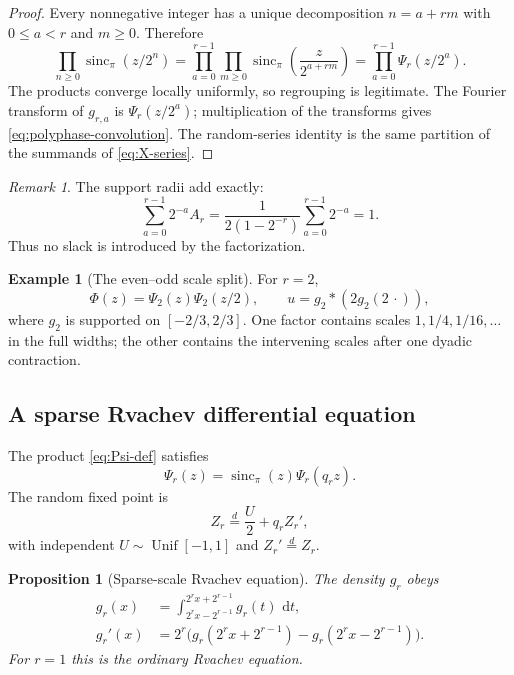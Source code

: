 \documentclass[11pt,oneside]{article}
\numberwithin{equation}{section}
\newtheorem{proposition}[theorem]{Proposition}
\theoremstyle{definition}
\newtheorem{example}[theorem]{Example}
\theoremstyle{remark}
\newtheorem{remark}[theorem]{Remark}
\newcommand{\sincpi}{\operatorname{sinc}_{\pi}}
\newcommand{\dd}{\,\mathrm d}
\begin{document}
\begin{proof}
Every nonnegative integer has a unique decomposition $n=a+rm$ with
$0\le a<r$ and $m\ge0$.  Therefore
\[
 \prod_{n\ge0}\sincpi(z/2^n)
 =\prod_{a=0}^{r-1}\prod_{m\ge0}
   \sincpi\!\left(\frac{z}{2^{a+rm}}\right)
 =\prod_{a=0}^{r-1}\Psi_r(z/2^a).
\]
The products converge locally uniformly, so regrouping is legitimate.  The
Fourier transform of $g_{r,a}$ is $\Psi_r(z/2^a)$; multiplication of the
transforms gives \eqref{eq:polyphase-convolution}.  The random-series identity
is the same partition of the summands of \eqref{eq:X-series}.
\end{proof}

\begin{remark}
The support radii add exactly:
\begin{equation}
 \sum_{a=0}^{r-1}2^{-a}A_r
 =\frac{1}{2(1-2^{-r})}\sum_{a=0}^{r-1}2^{-a}=1.            \label{eq:support-adds}
\end{equation}
Thus no slack is introduced by the factorization.
\end{remark}

\begin{example}[The even--odd scale split]
For $r=2$,
\begin{equation}
 \Phi(z)=\Psi_2(z)\Psi_2(z/2),
 \qquad
 u=g_2*(2g_2(2\,\cdot)),                                   \label{eq:r2-factorization}
\end{equation}
where $g_2$ is supported on $[-2/3,2/3]$.  One factor contains scales
$1,1/4,1/16,\ldots$ in the full widths; the other contains the intervening
scales after one dyadic contraction.
\end{example}

\subsection{A sparse Rvachev differential equation}

The product \eqref{eq:Psi-def} satisfies
\begin{equation}
 \Psi_r(z)=\sincpi(z)\Psi_r(q_rz).                          \label{eq:Psi-refinement}
\end{equation}
The random fixed point is
\begin{equation}
 Z_r\overset{d}=\frac{U}{2}+q_rZ_r',                        \label{eq:Zr-fixed-point}
\end{equation}
with independent $U\sim\operatorname{Unif}[-1,1]$ and
$Z_r'\overset d=Z_r$.

\begin{proposition}[Sparse-scale Rvachev equation]
\label{prop:sparse-DDE}
The density $g_r$ obeys
\begin{align}
 g_r(x)
 &=\int_{2^rx-2^{r-1}}^{2^rx+2^{r-1}}g_r(t)\,\dd t,        \label{eq:gr-integral-equation}\\
 g_r'(x)
 &=2^r\bigl(g_r(2^rx+2^{r-1})-g_r(2^rx-2^{r-1})\bigr).     \label{eq:gr-DDE}
\end{align}
For $r=1$ this is the ordinary Rvachev equation.
\end{proposition}
\end{document}

